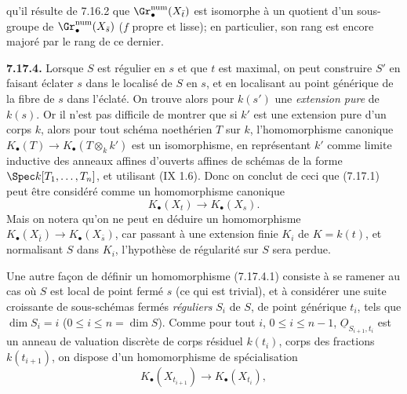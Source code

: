 
qu'il résulte de 7.16.2 que \(\Gr_\bullet^{\mathrm{num}}(X_{\bar t})\) est isomorphe à un quotient d'un sous-groupe de \(\Gr_\bullet^{\mathrm{num}}(X_{\bar s})\) (\(f\) propre et lisse); en particulier, son rang est encore majoré par le rang de ce dernier.

\textbf{7.17.4.} Lorsque \(S\) est régulier en \(s\) et que \(t\) est maximal, on peut construire \(S'\) en faisant éclater \(s\) dans le localisé de \(S\) en \(s\), et en localisant au point générique de la fibre de \(s\) dans l'éclaté. On trouve alors pour \(k(s')\) une \emph{extension pure} de \(k(s)\). Or il n'est pas difficile de montrer que si \(k'\) est une extension pure d'un corps \(k\), alors pour tout schéma noethérien \(T\) sur \(k\), l'homomorphisme canonique \(K_\bullet(T)\to K_\bullet(T\otimes_k k')\) est un isomorphisme, en représentant \(k'\) comme limite inductive des anneaux affines d'ouverts affines de schémas de la forme \(\Spec k[T_1,\ldots,T_n]\), et utilisant (IX 1.6). Donc on conclut de ceci que (7.17.1) peut être considéré comme un homomorphisme canonique
\begin{equation}\tag{7.17.4.1}
  K_\bullet(X_t)\longrightarrow K_\bullet(X_s).
\end{equation}
Mais on notera qu'on ne peut en déduire un homomorphisme \(K_\bullet(X_{\bar t})\to K_\bullet(X_{\bar s})\), car passant à une extension finie \(K_i\) de \(K=k(t)\), et normalisant \(S\) dans \(K_i\), l'hypothèse de régularité sur \(S\) sera perdue.

Une autre façon de définir un homomorphisme (7.17.4.1) consiste à se ramener au cas où \(S\) est local de point fermé \(s\) (ce qui est trivial), et à considérer une suite croissante de sous-schémas fermés \emph{réguliers} \(S_i\) de \(S\), de point générique \(t_i\), tels que \(\dim S_i=i\) (\(0\leq i\leq n=\dim S\)). Comme pour tout \(i\), \(0\leq i\leq n-1\), \(\underline{O}_{S_{i+1},t_i}\) est un anneau de valuation discrète de corps résiduel \(k(t_i)\), corps des fractions \(k(t_{i+1})\), on dispose d'un homomorphisme de spécialisation
\[
  K_\bullet(X_{t_{i+1}})\longrightarrow K_\bullet(X_{t_i}),
\]

